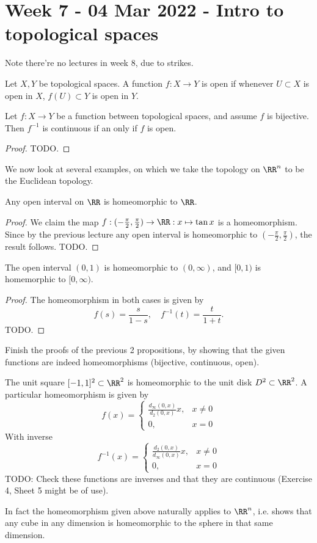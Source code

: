 \section{Week 7 - 04 Mar 2022 - Intro to topological spaces }
Note there're no lectures in week 8, due to strikes.
\begin{definition}
  Let $X,Y$ be topological spaces. A function $f:X\to Y$ is open if whenever
  $U\subset X$ is open in $X$, $f(U)\subset Y$ is open in $Y$.
  \label{<+label+>}
\end{definition}
\begin{proposition}
  Let $f:X\to Y$ be a function between topological spaces, and assume $f$ is
  bijective. Then $f^{-1}$ is continuous if an only if $f$ is open.
  \label{<+label+>}
\end{proposition}
\begin{proof}
  TODO.
\end{proof}
We now look at several examples, on which we take the topology on $\RR^n$ to be
the Euclidean topology.
\begin{proposition}
  Any open interval on $\RR$ is homeomorphic to $\RR$.
  \label{<+label+>}
\end{proposition}
\begin{proof}
  We claim the map $f:(-\frac{\pi}{2}, \frac{\pi}{2})\to\RR:x\mapsto\tan x$ is a
  homeomorphism. Since by the previous lecture any open interval is homeomorphic
  to $(-\frac{\pi}{2}, \frac{\pi}{2})$, the result follows. TODO.
\end{proof}

\begin{proposition}
  The open interval $(0,1)$ is homeomorphic to $(0,\infty)$, and $[0,1)$ is
  homemorphic to $[0,\infty)$.
  \label{<+label+>}
\end{proposition}
\begin{proof}
  The homeomorphism in both cases is given by 
  \[f(s) = \frac{s}{1-s}, \quad f^{-1}(t) =\frac{t}{1+t}.\]
  TODO.
\end{proof}
\begin{exercise}
  Finish the proofs of the previous 2 propositions, by showing that the given
  functions are indeed homeomorphisms (bijective, continuous, open).
\end{exercise}
\begin{example}
  The unit square $[-1,1]^2\subset \RR^2$ is homeomorphic to the unit disk
  $D^2\subset \RR^2$. A particular homeomorphism is given by 
  \[f(x) = \begin{cases}
      \frac{d_{\infty}(0,x)}{d_2(0,x)}x, & x\neq 0\\
      0, & x=0
    \end{cases}\]
  With inverse
  \[f^{-1}(x) = \begin{cases}
      \frac{d_2(0,x)}{d_{\infty}(0,x)}x, & x\neq 0\\
      0, & x=0
    \end{cases}\]
  TODO: Check these functions are inverses and that they are continuous
  (Exercise 4, Sheet 5 might be of use).
\end{example}
In fact the homeomorphism given above naturally applies to $\RR^n$, i.e. shows
that any cube in any dimension is homeomorphic to the sphere in that same
dimension.

